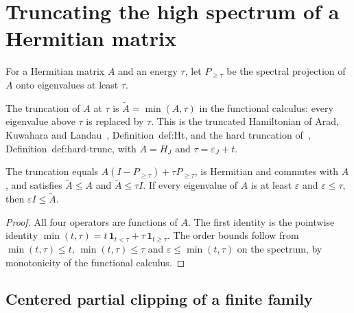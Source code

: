 \section{Truncating the high spectrum of a Hermitian matrix}
\label{sec:energy_truncation}

For a Hermitian matrix $A$ and an energy $\tau$, let $P_{\ge\tau}$ be the
spectral projection of $A$ onto eigenvalues at least $\tau$.

\begin{definition}
    \label{def:energy_truncation}
    \leanok
    The truncation of $A$ at $\tau$ is $\tilde A=\min(A,\tau)$ in the functional
    calculus: every eigenvalue above $\tau$ is replaced by $\tau$. This is the
    truncated Hamiltonian of Arad, Kuwahara and
    Landau~\cite{Arad2014Connecting}, Definition~def:Ht, and the hard truncation
    of~\cite[lines 873--886]{Arad2016RigorousRG}, Definition~def:hard-trunc,
    with $A=H_J$ and $\tau=\varepsilon_J+t$.
\end{definition}

\begin{theorem}
    \label{thm:energy_truncation}
    \leanok
    The truncation equals $A(I-P_{\ge\tau})+\tau P_{\ge\tau}$, is Hermitian and
    commutes with $A$, and satisfies $\tilde A\le A$ and $\tilde A\le\tau I$. If
    every eigenvalue of $A$ is at least $\varepsilon$ and $\varepsilon\le\tau$,
    then $\varepsilon I\le\tilde A$.
\end{theorem}

\begin{proof}
    \leanok
    All four operators are functions of $A$. The first identity is the
    pointwise identity $\min(t,\tau)=t\,\mathbf 1_{t<\tau}+\tau\,\mathbf
        1_{t\ge\tau}$. The order bounds follow from $\min(t,\tau)\le t$,
    $\min(t,\tau)\le\tau$ and $\varepsilon\le\min(t,\tau)$ on the spectrum, by
    monotonicity of the functional calculus.
\end{proof}


\subsection{Centered partial clipping of a finite family}

